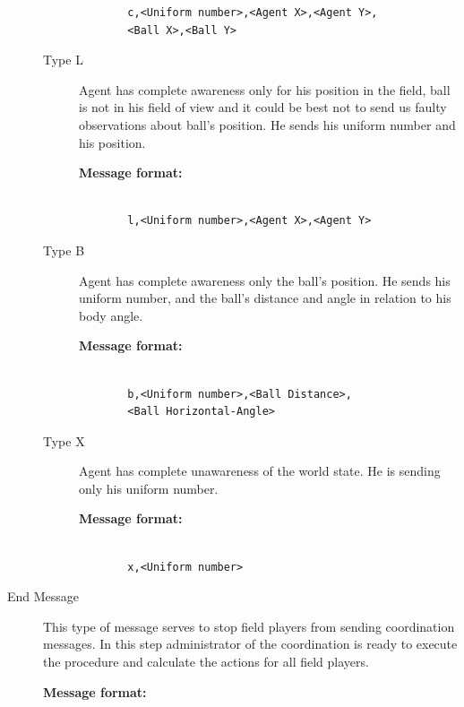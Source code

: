 \begin{description}
\begin{description}
\begin{description}
\begin{verbatim}
  c,<Uniform number>,<Agent X>,<Agent Y>,
  <Ball X>,<Ball Y>
  \end{verbatim}
\end{description}

\item[Type L] Agent has complete awareness only for his position in the field, ball is not in his field of view and it could be best not to send us faulty observations about ball's position. He sends his uniform number and his position.

\begin{description}
  \item[{\bf Message format:}]
  \begin{verbatim}
  
  l,<Uniform number>,<Agent X>,<Agent Y>
  \end{verbatim}
\end{description}

\item[Type B] Agent has complete awareness only the ball's position. He sends his uniform number,  and the ball's distance and angle in relation to his body angle.

\begin{description}
  \item[{\bf Message format:}]
  \begin{verbatim}
  
  b,<Uniform number>,<Ball Distance>,
  <Ball Horizontal-Angle>
  \end{verbatim}
\end{description}

\item[Type X] Agent has complete unawareness of the world state. He is sending only his uniform number.

\begin{description}
  \item[{\bf Message format:}]
  \begin{verbatim}
  
  x,<Uniform number>
  \end{verbatim}
\end{description}

\end{description}
\item[End Message]
This type of message serves to stop field players from sending coordination messages. In this step administrator of the coordination is ready to execute the procedure and calculate the actions for all field players.
\begin{description}
  \item[{\bf Message format:}]
  \begin{verbatim}
  

\end{verbatim}
\end{description}
\end{description}
